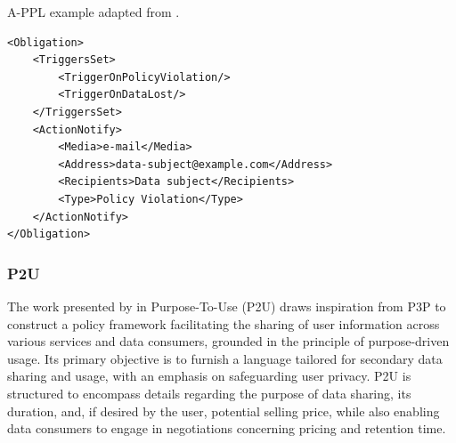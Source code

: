 \begin{listing}[ht]
\caption[A-PPL policy.]{A-PPL example adapted from \cite{azraoui_appl_2014}.}
\label{list:appl_example}
\begin{verbatim}
<Obligation>
    <TriggersSet>
        <TriggerOnPolicyViolation/>
        <TriggerOnDataLost/>
    </TriggersSet>
    <ActionNotify>
        <Media>e-mail</Media>
        <Address>data-subject@example.com</Address>
        <Recipients>Data subject</Recipients>
        <Type>Policy Violation</Type>
    </ActionNotify>
</Obligation>
\end{verbatim}
\end{listing}

\subsubsection{P2U}
\label{sec:p2u}

The work presented by \cite{iyilade_p2u_2014} in Purpose-To-Use (P2U) draws inspiration from P3P to construct a policy framework facilitating the sharing of user information across various services and data consumers, grounded in the principle of purpose-driven usage.
Its primary objective is to furnish a language tailored for secondary data sharing and usage, with an emphasis on safeguarding user privacy. 
P2U is structured to encompass details regarding the purpose of data sharing, its duration, and, if desired by the user, potential selling price, while also enabling data consumers to engage in negotiations concerning pricing and retention time.

